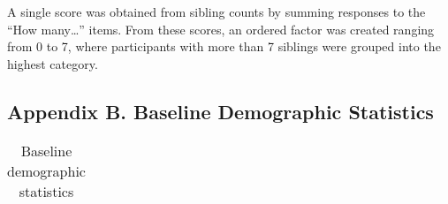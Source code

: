 \documentclass[
  single column]{article}
\begin{document}
A single score was obtained from sibling counts by summing responses to
the ``How many\ldots{}'' items. From these scores, an ordered factor was
created ranging from 0 to 7, where participants with more than 7
siblings were grouped into the highest category.

\newpage{}

\subsection{Appendix B. Baseline Demographic
Statistics}\label{appendix-demographics}

\begin{longtable}[]{@{}ll@{}}

\caption{\label{tbl-table-demography}Baseline demographic statistics}

\tabularnewline


\end{longtable}
\end{document}
